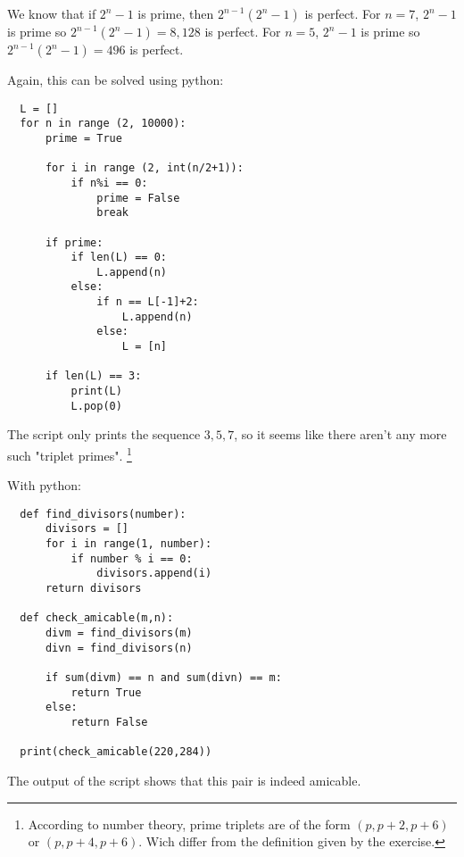 
\sol We know that if $2^n - 1$ is prime, then $2^{n-1}(2^n -1)$ is perfect.
For $n = 7$, $2^n - 1$ is prime so $2^{n-1}(2^n -1) = 8,128$ is perfect.
For $n = 5$, $2^n - 1$ is prime so $2^{n-1}(2^n -1) = 496$ is perfect.


\sol Again, this can be solved using python:
\begin{verbatim}
  L = []
  for n in range (2, 10000):
      prime = True

      for i in range (2, int(n/2+1)):
          if n%i == 0:
              prime = False
              break

      if prime:
          if len(L) == 0:
              L.append(n)
          else:
              if n == L[-1]+2:
                  L.append(n)
              else:
                  L = [n]

      if len(L) == 3:
          print(L)
          L.pop(0)
\end{verbatim}
The script only prints the sequence $3, 5, 7$, so it seems like there aren't any more such "triplet primes".
\footnote{
  According to number theory, prime triplets are of the form $(p, p+2, p+6)$ or $(p, p+4, p+6)$.
  Wich differ from the definition given by the exercise.
}


\sol With python:
\begin{verbatim}
  def find_divisors(number):
      divisors = []
      for i in range(1, number):
          if number % i == 0:
              divisors.append(i)
      return divisors

  def check_amicable(m,n):
      divm = find_divisors(m)
      divn = find_divisors(n)

      if sum(divm) == n and sum(divn) == m:
          return True
      else:
          return False

  print(check_amicable(220,284))
\end{verbatim}
The output of the script shows that this pair is indeed amicable.
